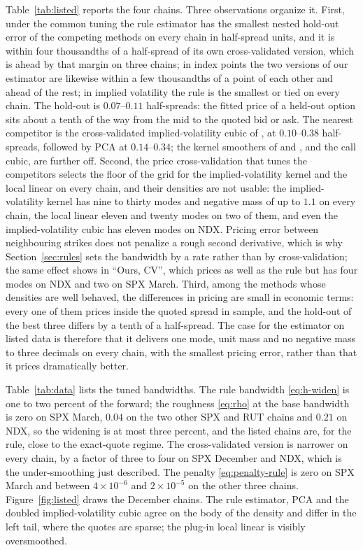 \documentclass[preprint,12pt,authoryear,times]{elsarticle}
\begin{document}
Table~\ref{tab:listed} reports the four chains. Three observations organize it. First, under the common tuning the rule estimator has the smallest nested hold-out error of the competing methods on every chain in half-spread units, and it is within four thousandths of a half-spread of its own cross-validated version, which is ahead by that margin on three chains; in index points the two versions of our estimator are likewise within a few thousandths of a point of each other and ahead of the rest; in implied volatility the rule is the smallest or tied on every chain. The hold-out is \(0.07\)--\(0.11\) half-spreads: the fitted price of a held-out option sits about a tenth of the way from the mid to the quoted bid or ask. The nearest competitor is the cross-validated implied-volatility cubic of \citeauthor{grith2012}, at \(0.10\)--\(0.38\) half-spreads, followed by PCA at \(0.14\)--\(0.34\); the kernel smoothers of \citeauthor{aitsahalia1998} and \citeauthor{aitsahalia2003}, and the call cubic, are further off. Second, the price cross-validation that tunes the competitors selects the floor of the grid for the implied-volatility kernel and the local linear on every chain, and their densities are not usable: the implied-volatility kernel has nine to thirty modes and negative mass of up to \(1.1\) on every chain, the local linear eleven and twenty modes on two of them, and even the implied-volatility cubic has eleven modes on NDX. Pricing error between neighbouring strikes does not penalize a rough second derivative, which is why Section~\ref{sec:rules} sets the bandwidth by a rate rather than by cross-validation; the same effect shows in ``Ours, CV'', which prices as well as the rule but has four modes on NDX and two on SPX March. Third, among the methods whose densities are well behaved, the differences in pricing are small in economic terms: every one of them prices inside the quoted spread in sample, and the hold-out of the best three differs by a tenth of a half-spread. The case for the estimator on listed data is therefore that it delivers one mode, unit mass and no negative mass to three decimals on every chain, with the smallest pricing error, rather than that it prices dramatically better.

Table~\ref{tab:data} lists the tuned bandwidths. The rule bandwidth \eqref{eq:h-widen} is one to two percent of the forward; the roughness \eqref{eq:rho} at the base bandwidth is zero on SPX March, \(0.04\) on the two other SPX and RUT chains and \(0.21\) on NDX, so the widening is at most three percent, and the listed chains are, for the rule, close to the exact-quote regime. The cross-validated version is narrower on every chain, by a factor of three to four on SPX December and NDX, which is the under-smoothing just described. The penalty \eqref{eq:penalty-rule} is zero on SPX March and between \(4\times 10^{-6}\) and \(2\times 10^{-5}\) on the other three chains. Figure~\ref{fig:listed} draws the December chains. The rule estimator, PCA and the doubled implied-volatility cubic agree on the body of the density and differ in the left tail, where the quotes are sparse; the plug-in local linear is visibly oversmoothed.
\end{document}
